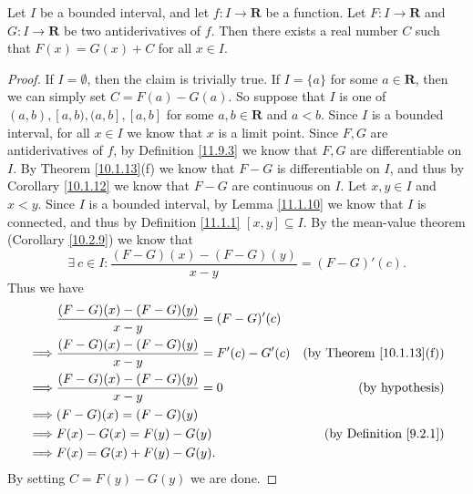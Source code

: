 \begin{lemma}\label{11.9.5}
    Let \(I\) be a bounded interval, and let \(f : I \to \mathbf{R}\) be a function.
    Let \(F : I \to \mathbf{R}\) and \(G : I \to \mathbf{R}\) be two antiderivatives of \(f\).
    Then there exists a real number \(C\) such that \(F(x) = G(x) + C\) for all \(x \in I\).
\end{lemma}

\begin{proof}
    If \(I = \emptyset\), then the claim is trivially true.
    If \(I = \{a\}\) for some \(a \in \mathbf{R}\), then we can simply set \(C = F(a) - G(a)\).
    So suppose that \(I\) is one of \((a, b), [a, b), (a, b], [a, b]\) for some \(a, b \in \mathbf{R}\) and \(a < b\).
    Since \(I\) is a bounded interval, for all \(x \in I\) we know that \(x\) is a limit point.
    Since \(F, G\) are antiderivatives of \(f\), by Definition \ref{11.9.3} we know that \(F, G\) are differentiable on \(I\).
    By Theorem \ref{10.1.13}(f) we know that \(F - G\) is differentiable on \(I\), and thus by Corollary \ref{10.1.12} we know that \(F - G\) are continuous on \(I\).
    Let \(x, y \in I\) and \(x < y\).
    Since \(I\) is a bounded interval, by Lemma \ref{11.1.10} we know that \(I\) is connected, and thus by Definition \ref{11.1.1} \([x, y] \subseteq I\).
    By the mean-value theorem (Corollary \ref{10.2.9}) we know that
    \[
        \exists\ c \in I : \frac{(F - G)(x) - (F - G)(y)}{x - y} = (F - G)'(c).
    \]
    Thus we have
    \begin{align*}
                 & \frac{(F - G)(x) - (F - G)(y)}{x - y} = (F - G)'(c)                                          \\
        \implies & \frac{(F - G)(x) - (F - G)(y)}{x - y} = F'(c) - G'(c) & \text{(by Theorem \ref{10.1.13}(f))} \\
        \implies & \frac{(F - G)(x) - (F - G)(y)}{x - y} = 0             & \text{(by hypothesis)}               \\
        \implies & (F - G)(x) = (F - G)(y)                                                                      \\
        \implies & F(x) - G(x) = F(y) - G(y)                             & \text{(by Definition \ref{9.2.1})}   \\
        \implies & F(x) = G(x) + F(y) - G(y).
    \end{align*}
    By setting \(C = F(y) - G(y)\) we are done.
\end{proof}

